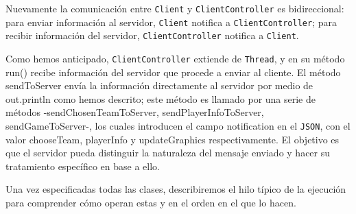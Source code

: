 \documentclass[12pt,a4paper,openright]{book}
\theoremstyle{break}
\begin{document}
Nuevamente la comunicación entre \texttt{Client} y \texttt{ClientController} es bidireccional: para enviar información al servidor, \texttt{Client} notifica a \texttt{ClientController}; para recibir información del servidor, \texttt{ClientController} notifica a \texttt{Client}.

Como hemos anticipado, \texttt{ClientController} extiende de \texttt{Thread}, y en su método run() recibe información del servidor que procede a enviar al cliente. El método sendToServer envía la información directamente al servidor por medio de out.println como hemos descrito; este método es llamado por una serie de métodos -sendChosenTeamToServer, sendPlayerInfoToServer, sendGameToServer-, los cuales introducen el campo notification en el \texttt{JSON}, con el valor chooseTeam, playerInfo y updateGraphics respectivamente. El objetivo es que el servidor pueda distinguir la naturaleza del mensaje enviado y hacer su tratamiento específico en base a ello.

Una vez especificadas todas las clases, describiremos el hilo típico de la ejecución para comprender cómo operan estas y en el orden en el que lo hacen.
\end{document}
